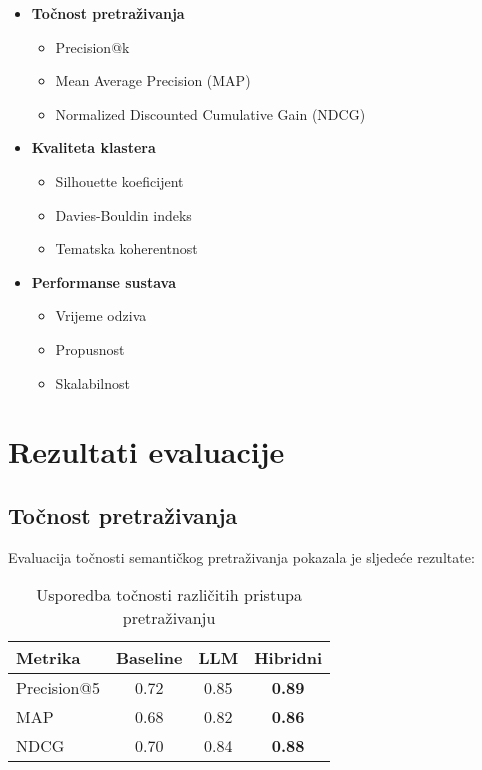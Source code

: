 \begin{itemize}
    \item \textbf{Točnost pretraživanja}
    \begin{itemize}
        \item Precision@k
        \item Mean Average Precision (MAP)
        \item Normalized Discounted Cumulative Gain (NDCG)
    \end{itemize}
    
    \item \textbf{Kvaliteta klastera}
    \begin{itemize}
        \item Silhouette koeficijent
        \item Davies-Bouldin indeks
        \item Tematska koherentnost
    \end{itemize}
    
    \item \textbf{Performanse sustava}
    \begin{itemize}
        \item Vrijeme odziva
        \item Propusnost
        \item Skalabilnost
    \end{itemize}
\end{itemize}

\section{Rezultati evaluacije}
\label{sec:results}

\subsection{Točnost pretraživanja}
Evaluacija točnosti semantičkog pretraživanja pokazala je sljedeće rezultate:

\begin{table}[h]
\centering
\begin{tabular}{|l|c|c|c|}
\hline
\textbf{Metrika} & \textbf{Baseline} & \textbf{LLM} & \textbf{Hibridni} \\
\hline
Precision@5 & 0.72 & 0.85 & \textbf{0.89} \\
MAP & 0.68 & 0.82 & \textbf{0.86} \\
NDCG & 0.70 & 0.84 & \textbf{0.88} \\
\hline
\end{tabular}
\caption{Usporedba točnosti različitih pristupa pretraživanju}
\label{tab:search_accuracy}
\end{table}

